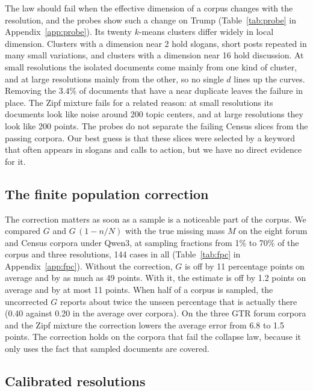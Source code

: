 The law should fail when the effective dimension of a corpus changes with the resolution, and the probes show such a change on Trump (Table~\ref{tab:probe} in Appendix~\ref{app:probe}). Its twenty $k$-means clusters differ widely in local dimension. Clusters with a dimension near 2 hold slogans, short posts repeated in many small variations, and clusters with a dimension near 16 hold discussion. At small resolutions the isolated documents come mainly from one kind of cluster, and at large resolutions mainly from the other, so no single $d$ lines up the curves. Removing the 3.4\% of documents that have a near duplicate leaves the failure in place. The Zipf mixture fails for a related reason: at small resolutions its documents look like noise around 200 topic centers, and at large resolutions they look like 200 points. The probes do not separate the failing Census slices from the passing corpora. Our best guess is that these slices were selected by a keyword that often appears in slogans and calls to action, but we have no direct evidence for it.

\subsection{The finite population correction}
\label{sec:fpc}

The correction matters as soon as a sample is a noticeable part of the corpus. We compared $G$ and $G\,(1 - n/N)$ with the true missing mass $M$ on the eight forum and Census corpora under Qwen3, at sampling fractions from 1\% to 70\% of the corpus and three resolutions, 144 cases in all (Table~\ref{tab:fpc} in Appendix~\ref{app:fpc}). Without the correction, $G$ is off by 11 percentage points on average and by as much as 49 points. With it, the estimate is off by 1.2 points on average and by at most 11 points. When half of a corpus is sampled, the uncorrected $G$ reports about twice the unseen percentage that is actually there (0.40 against 0.20 in the average over corpora). On the three GTR forum corpora and the Zipf mixture the correction lowers the average error from 6.8 to 1.5 points. The correction holds on the corpora that fail the collapse law, because it only uses the fact that sampled documents are covered.

\subsection{Calibrated resolutions}
\label{sec:rcal}


